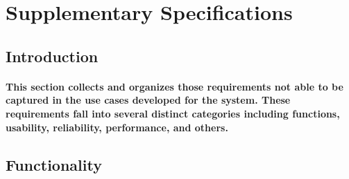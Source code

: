 \section{Supplementary Specifications}
\subsection{Introduction}
\paragraph{This section collects and organizes those requirements not able to be captured in the use cases developed for the system. These requirements fall into several distinct categories including functions, usability, reliability, performance, and others.}
\subsection{Functionality}
